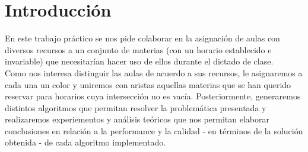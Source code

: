 \section{Introducción}
En este trabajo práctico se nos pide colaborar en la asignación de aulas con diversos recursos a un conjunto de materias (con un horario establecido e invariable) que necesitarían hacer uso de ellos durante el dictado de clase.\\
Como nos interesa distinguir las aulas de acuerdo a sus recursos, le asignaremos a cada una un color y uniremos con aristas aquellas materias que se han querido reservar para horarios cuya intersección no es vacía. Posteriormente, generaremos distintos algoritmos que permitan resolver la problemática presentada y realizaremos experiementos y análisis teóricos que nos permitan elaborar conclusiones en relación a la performance y la calidad - en términos de la solución obtenida - de cada algoritmo implementado.